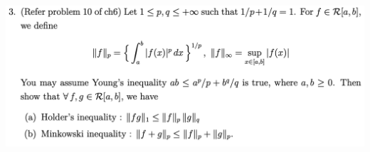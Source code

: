 \documentclass{report}
\begin{document}
\begin{question}{}{}
\includegraphics[height=8cm,width=18cm]{ahw4q3}
\end{question}
\end{document}
